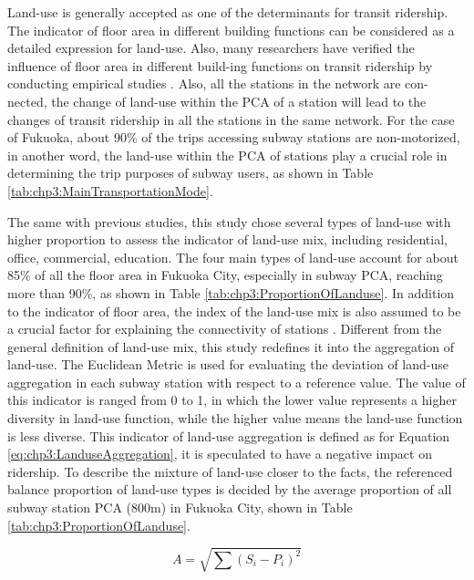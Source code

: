 %
Land-use is generally accepted as one of the determinants for transit ridership. The indicator of floor area in different building functions can be considered as a detailed expression for land-use. Also, many researchers have verified the influence of floor area in different build-ing functions on transit ridership by conducting empirical studies \cite{sohn2010factors,gutierrez2011transit,chakraborty2013land,chakraborty2013land,jun2015land}. Also, all the stations in the network are con-nected, the change of land-use within the PCA of a station will lead to the changes of transit ridership in all the stations in the same network. For the case of Fukuoka, about 90\% of the trips accessing subway stations are non-motorized, in another word, the land-use within the PCA of stations play a crucial role in determining the trip purposes of subway users, as shown in Table \ref{tab:chp3:MainTransportationMode}.

%
The same with previous studies, this study chose several types of land-use with higher proportion to assess the indicator of land-use mix, including residential, office, commercial, education. The four main types of land-use account for about 85\% of all the floor area in Fukuoka City, especially in subway PCA, reaching more than 90\%, as shown in Table \ref{tab:chp3:ProportionOfLanduse}. In addition to the indicator of floor area, the index of the land-use mix is also assumed to be a crucial factor for explaining the connectivity of stations \cite{badoe2000transportation,cervero2004transit,frank2004obesity}. Different from the general definition of land-use mix, this study redefines it into the aggregation of land-use. The Euclidean Metric is used for evaluating the deviation of land-use aggregation in each subway station with respect to a reference value. The value of this indicator is ranged from 0 to 1, in which the lower value represents a higher diversity in land-use function, while the higher value means the land-use function is less diverse. This indicator of land-use aggregation is defined as for Equation \ref{eq:chp3:LanduseAggregation}, it is speculated to have a negative impact on ridership. To describe the mixture of land-use closer to the facts, the referenced balance proportion of land-use types is decided by the average proportion of all subway station PCA (800m) in Fukuoka City, shown in Table \ref{tab:chp3:ProportionOfLanduse}.

\begin{equation}
	A=\sqrt{\sum (S_i-P_i)^2}
	\label{eq:chp3:LanduseAggregation}
\end{equation}

